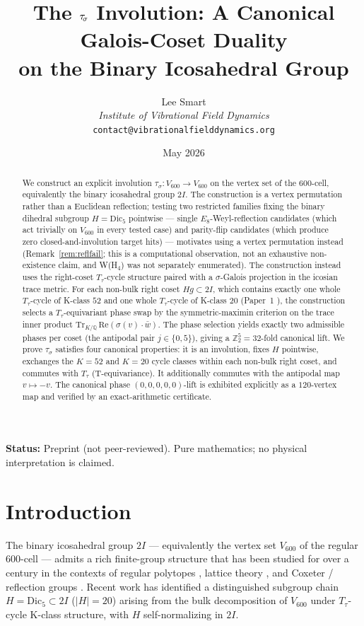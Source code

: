 \documentclass[11pt]{article}
\title{The $\tausigma$ Involution: A Canonical Galois-Coset Duality\\
       on the Binary Icosahedral Group}
\author{%
  Lee Smart \\[3pt]
  \textit{Institute of Vibrational Field Dynamics} \\[2pt]
  \texttt{contact@vibrationalfielddynamics.org}}
\date{May 2026}
\newcommand{\twoI}{2I}
\newcommand{\Vsixhundred}{V_{600}}
\newcommand{\Dicfive}{\mathrm{Dic}_5}
\newcommand{\sigmaG}{\sigma}
\newcommand{\tausigma}{\tau_{\!\sigmaG}}
\newcommand{\Ttau}{T_{\tau}}
\newcommand{\Trbil}{\mathrm{Tr}}
\begin{document}
\maketitle

\noindent\textbf{Status:} Preprint (not peer-reviewed). Pure mathematics; no physical interpretation is claimed.

\begin{abstract}
We construct an explicit involution
$\tausigma : \Vsixhundred \to \Vsixhundred$ on the vertex set of the
$600$-cell, equivalently the binary icosahedral group $\twoI$. The
construction is a vertex permutation rather than a Euclidean
reflection; testing two restricted families fixing the binary
dihedral subgroup $H = \Dicfive$ pointwise — single
$E_8$-Weyl-reflection candidates (which act trivially on
$\Vsixhundred$ in every tested case) and parity-flip candidates
(which produce zero closed-and-involution target hits) — motivates
using a vertex permutation instead (Remark~\ref{rem:reflfail}; this is
a computational observation, not an exhaustive non-existence claim,
and W(H$_4$) was not separately enumerated). The construction instead
uses the right-coset
$\Ttau$-cycle structure paired with a $\sigmaG$-Galois projection in
the icosian trace metric. For each non-bulk right coset
$Hg \subset \twoI$, which contains exactly one whole $\Ttau$-cycle of
K-class $52$ and one whole $\Ttau$-cycle of K-class $20$ (Paper~1
\citep{V600Paper1}), the construction selects a $\Ttau$-equivariant
phase swap by the symmetric-maximin criterion on the trace inner
product $\Trbil_{K/\mathbb{Q}}\,\mathrm{Re}(\sigmaG(v) \cdot \bar w)$.
The phase selection yields exactly two admissible phases per coset
(the antipodal pair $j \in \{0, 5\}$), giving a $\mathbb{Z}_2^5 = 32$-fold
canonical lift. We prove $\tausigma$ satisfies four canonical
properties: it is an involution, fixes $H$ pointwise, exchanges the
$K=52$ and $K=20$ cycle classes within each non-bulk right coset, and
commutes with $\Ttau$ (T-equivariance). It additionally commutes with
the antipodal map $v \mapsto -v$. The canonical phase
$(0,0,0,0,0)$-lift is exhibited explicitly as a $120$-vertex map and
verified by an exact-arithmetic certificate.
\end{abstract}

\section{Introduction}\label{sec:intro}

The binary icosahedral group $\twoI$ — equivalently the vertex set
$\Vsixhundred$ of the regular $600$-cell — admits a rich finite-group
structure that has been studied for over a century in the contexts of
regular polytopes \citep{Coxeter1973}, lattice theory
\citep{ConwaySloane1988,Elkies1995}, and Coxeter / reflection groups
\citep{Humphreys1990}. Recent work \citep{V600Paper1} has identified a
distinguished subgroup chain $H = \Dicfive \subset \twoI$ ($|H| = 20$)
arising from the bulk decomposition of $\Vsixhundred$ under
$\Ttau$-cycle K-class structure, with $H$ self-normalizing in
$\twoI$.
\end{document}
